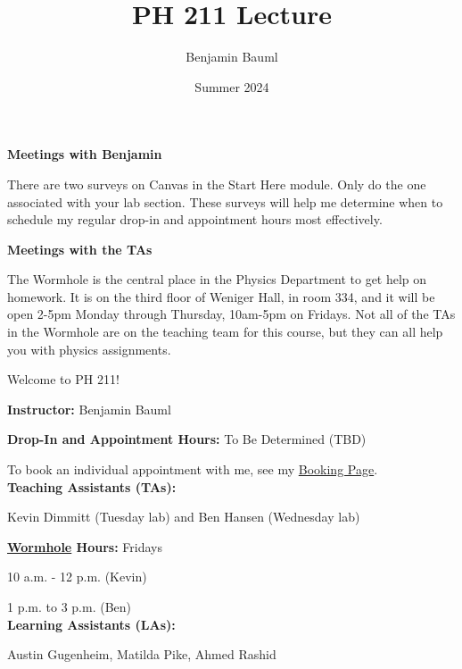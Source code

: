 \documentclass[]{article}
\title{PH 211 Lecture \Lec}
\author{Benjamin Bauml}
\date{Summer 2024}
\begin{document}
\begin{TeacherMargin}
\noindent\textbf{Meetings with Benjamin}

There are two surveys on Canvas in the Start Here module. Only do the one associated with your lab section. These surveys will help me determine when to schedule my regular drop-in and appointment hours most effectively.

\noindent\textbf{Meetings with the TAs}

The Wormhole is the central place in the Physics Department to get help on homework. It is on the third floor of Weniger Hall, in room 334, and it will be open 2-5pm Monday through Thursday, 10am-5pm on Fridays. Not all of the TAs in the Wormhole are on the teaching team for this course, but they can all help you with physics assignments.
\end{TeacherMargin}
\begin{PresentSpace}
\begin{center}
	\huge Welcome to PH 211!
\end{center}
\noindent\textbf{Instructor:} Benjamin Bauml

\noindent\textbf{Drop-In and Appointment Hours:} To Be Determined (TBD)

To book an individual appointment with me, see my \href{https://outlook.office.com/bookwithme/user/8a879d0af7bf45e890abd3d888d8bfe4@oregonstate.edu?anonymous&ep=plink}{\color{blue}Booking Page}. \\

\noindent\textbf{Teaching Assistants (TAs):}

\noindent Kevin Dimmitt (Tuesday lab) and Ben Hansen (Wednesday lab)

\noindent\textbf{\href{https://wormhole.physics.oregonstate.edu/}{\color{blue}Wormhole} Hours:} Fridays

10 a.m. - 12 p.m. (Kevin)

1 p.m. to 3 p.m. (Ben) \\

\noindent\textbf{Learning Assistants (LAs):}

\noindent Austin Gugenheim, Matilda Pike, Ahmed Rashid
\end{PresentSpace}
\newpage
\end{document}
